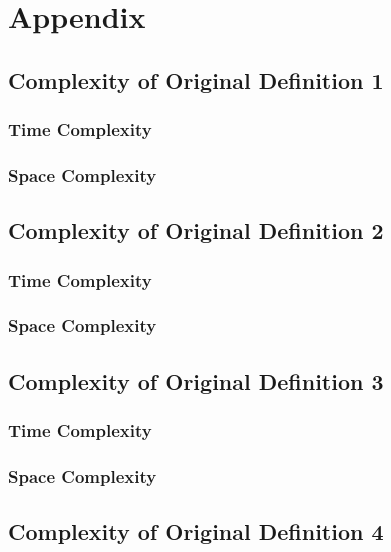 \documentclass[conference]{IEEEtran}
\begin{document}
\section{Appendix}

\subsection{Complexity of Original Definition 1}

\subsubsection{Time Complexity}

\subsubsection{Space Complexity}

\subsection{Complexity of Original Definition 2}

\subsubsection{Time Complexity}

\subsubsection{Space Complexity}

\subsection{Complexity of Original Definition 3}

\subsubsection{Time Complexity}

\subsubsection{Space Complexity}

\subsection{Complexity of Original Definition 4}
\end{document}
